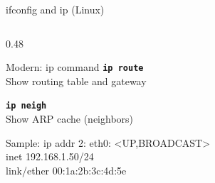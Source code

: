 \documentclass[aspectratio=169]{beamer}  %
\begin{document}
\begin{frame}{ifconfig and ip (Linux)}
\begin{columns}[T]
\begin{column}{0.48\textwidth}
\begin{block}{Modern: ip command}
                \vspace{0.3em}
                \texttt{\textbf{ip route}} \\
                Show routing table and gateway
                
                \vspace{0.3em}
                \texttt{\textbf{ip neigh}} \\
                Show ARP cache (neighbors)
            \end{block}
            
            \vspace{0.2em}
            \begin{exampleblock}{Sample: ip addr}
                \ttfamily\tiny
                2: eth0: <UP,BROADCAST> \\
                \quad inet \textcolor{ipblue}{192.168.1.50/24} \\
                \quad link/ether \textcolor{networkgreen}{00:1a:2b:3c:4d:5e}
            \end{exampleblock}
        \end{column}
    \end{columns}
\end{frame}
\end{document}
